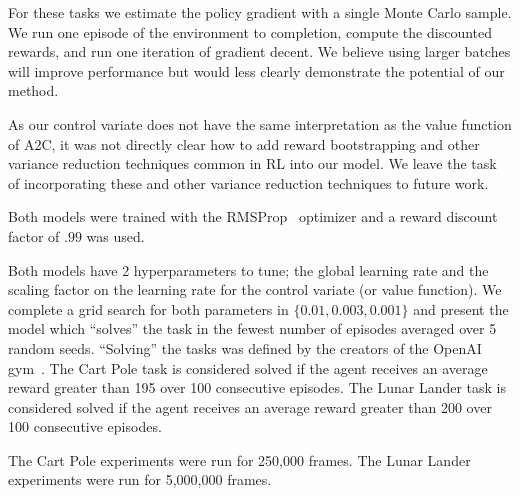 \documentclass{article}
\begin{document}
For these tasks we estimate the policy gradient with a single Monte Carlo sample.
We run one episode of the environment to completion, compute the discounted rewards, and run one iteration of gradient decent.
We believe using larger batches will improve performance but would less clearly demonstrate the potential of our method. 

As our control variate does not have the same interpretation as the value function of A2C, it was not directly clear how to add reward bootstrapping and other variance reduction techniques common in RL into our model. We leave the task of incorporating these and other variance reduction techniques to future work.  

Both models were trained with the RMSProp~\citep{Tieleman2012} optimizer and a reward discount factor of $.99$ was used.

Both models have 2 hyperparameters to tune; the global learning rate and the scaling factor on the learning rate for the control variate (or value function).
We complete a grid search for both parameters in $\{0.01, 0.003, 0.001\}$ and present the model which ``solves'' the task in the fewest number of episodes averaged over 5 random seeds.
``Solving'' the tasks was defined by the creators of the OpenAI gym~\citep{1606.01540}.
The Cart Pole task is considered solved if the agent receives an average reward greater than 195 over 100 consecutive episodes.
The Lunar Lander task is considered solved if the agent receives an average reward greater than 200 over 100 consecutive episodes. 

The Cart Pole experiments were run for 250,000 frames.
The Lunar Lander experiments were run for 5,000,000 frames. 
\end{document}
